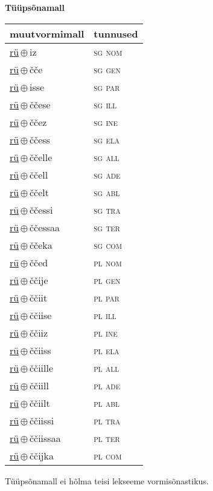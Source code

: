 

\vspace{3.5em}
\noindent \begin{minipage}{\textwidth}
\noindent \textbf{Tüüpsõnamall \,}\\

\begin{sideways}
\begin{tabular}{l l}
muutvormimall & tunnused \\
\hline
\underline{rü}\,$\oplus$\,iz & \textsc{ sg nom } \\
\underline{rü}\,$\oplus$\,čče & \textsc{ sg gen } \\
\underline{rü}\,$\oplus$\,isse & \textsc{ sg par } \\
\underline{rü}\,$\oplus$\,ččese & \textsc{ sg ill } \\
\underline{rü}\,$\oplus$\,ččez & \textsc{ sg ine } \\
\underline{rü}\,$\oplus$\,ččess & \textsc{ sg ela } \\
\underline{rü}\,$\oplus$\,ččelle & \textsc{ sg all } \\
\underline{rü}\,$\oplus$\,ččell & \textsc{ sg ade } \\
\underline{rü}\,$\oplus$\,ččelt & \textsc{ sg abl } \\
\underline{rü}\,$\oplus$\,ččessi & \textsc{ sg tra } \\
\underline{rü}\,$\oplus$\,ččessaa & \textsc{ sg ter } \\
\underline{rü}\,$\oplus$\,ččeka & \textsc{ sg com } \\
\underline{rü}\,$\oplus$\,ččed & \textsc{ pl nom } \\
\underline{rü}\,$\oplus$\,ččije & \textsc{ pl gen } \\
\underline{rü}\,$\oplus$\,ččiit & \textsc{ pl par } \\
\underline{rü}\,$\oplus$\,ččiise & \textsc{ pl ill } \\
\underline{rü}\,$\oplus$\,ččiiz & \textsc{ pl ine } \\
\underline{rü}\,$\oplus$\,ččiiss & \textsc{ pl ela } \\
\underline{rü}\,$\oplus$\,ččiille & \textsc{ pl all } \\
\underline{rü}\,$\oplus$\,ččiill & \textsc{ pl ade } \\
\underline{rü}\,$\oplus$\,ččiilt & \textsc{ pl abl } \\
\underline{rü}\,$\oplus$\,ččiissi & \textsc{ pl tra } \\
\underline{rü}\,$\oplus$\,ččiissaa & \textsc{ pl ter } \\
\underline{rü}\,$\oplus$\,ččijka & \textsc{ pl com } \\
\end{tabular}
\end{sideways}
\label{tab:tüüpsõnamall-rüiz}

\end{minipage}

 
\vspace{1em}
\noindent Tüüpsõnamall  ei hõlma teisi lekseeme vormi\-sõnastikus.
